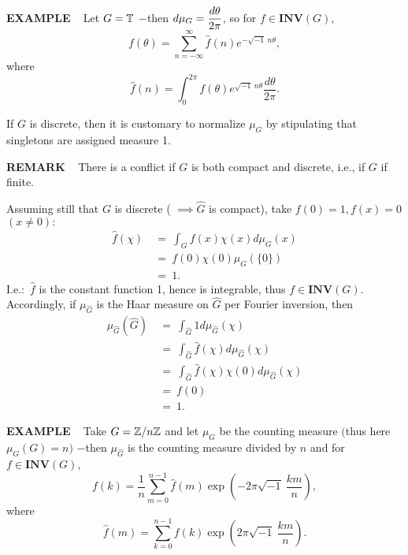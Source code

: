 \vspace{0.1cm}

\begin{x}{\small\bf EXAMPLE} \ %
Let $G = \mathbb{T}$ $-$then $d\mu_G = \displaystyle\frac{d\theta}{2\pi}$, so for $f \in \mathbf{INV}(G)$,
\[
f(\theta) = \sum_{n = -\infty}^\infty \widehat{f}(n) e^{-\sqrt{-1} \ n \theta},
\]
where
\[
\widehat{f}(n) = \int_0^{2\pi} f(\theta) e^{\sqrt{-1} \  n \theta} \frac{d\theta}{2\pi}.
\]

\vspace{0.1cm}

If $G$ is discrete, then it is customary to normalize $\mu_G$ by stipulating that singletons are assigned measure 1.
\end{x}

\vspace{0.1cm}

\begin{x}{\small\bf REMARK} \ %
There is a conflict if $G$ is both compact and discrete, i.e., if $G$ if finite.
\end{x}

\vspace{0.1cm}

\allowdisplaybreaks
Assuming still that $G$ is discrete ( $\implies \widehat{G}$ is compact), take $f(0) = 1, f(x) = 0$ $(x \ne 0):$
\begin{align*}
\widehat{f}(\chi)	 \ 
&= \  \int_G f(x) \chi(x) d\mu_G(x)\\	
&= \ f(0) \chi(0) \mu_G(\{0\})\\		
&= \ 1.
\end{align*}
I.e.$:$ $\widehat{f}$ is the constant function 1, hence is integrable, thus $f \in \mathbf{INV}(G)$.  Accordingly, if $\mu_{\widehat{G}}$ is the Haar measure on $\widehat{G}$ per Fourier inversion, then
\begin{align*}
\mu_{\widehat{G}}(\widehat{G}) 	 \ 
&= \ \int_{\widehat{G}} 1 d \mu_{\widehat{G}}(\chi)  \\		 						
&= \  \int_{\widehat{G}} \widehat{f}(\chi) d \mu_{\widehat{G}}(\chi)  \\
&= \ \int_{\widehat{G}} \widehat{f}(\chi) \chi(0)d \mu_{\widehat{G}}(\chi)  \\	
&= \ f(0)\\
&=	\ 1.
\end{align*}


\begin{x}{\small\bf EXAMPLE} \ %
Take $G = \mathbb{Z} / n\mathbb{Z}$ and let $\mu_G$ be the counting measure $($thus here $\mu_G(G) = n)$ $-$then $\mu_{\widehat{G}}$ is the counting measure divided by $n$ and for $f \in \mathbf{INV}(G)$, 
\[
f(k) = \frac{1}{n} \sum_{m = 0} ^{n - 1} \widehat{f}(m) \exp(-2\pi\sqrt{-1} \ \frac{km}{n}),
\]
where
\[
\widehat{f}(m) = \sum_{k = 0} ^{n - 1} f(k) \exp(2\pi\sqrt{-1} \ \frac{km}{n}).
\]
\end{x}

